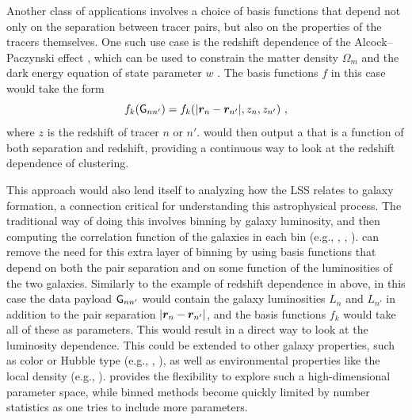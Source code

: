 Another class of applications involves a choice of basis functions that depend not only on the separation between tracer pairs, but also on the properties of the tracers themselves.
One such use case is the redshift dependence of the Alcock--Paczynski effect \citep{AlcockPaczynski1979}, which can be used to constrain the matter density $\Omega_m$ and the dark energy equation of state parameter $w$ \citep{Li2016}.
The basis functions $f$ in this case would take the form
\begin{equation}
    \label{eq:ff_redshift}
    f_k(\mathsf{G}_{n n'}) = f_k(|\bm{r}_n - \bm{r}_{n'}|, z_n, z_{n'}) ~,
\end{equation}
where $z$ is the redshift of tracer $n$ or $n'$.
\Est would then output a \cf that is a function of both separation and redshift, providing a continuous way to look at the redshift dependence of clustering.

This approach would also lend itself to analyzing how the LSS relates to galaxy formation, a connection critical for understanding this astrophysical process.
The traditional way of doing this involves binning by galaxy luminosity, and then computing the correlation function of the galaxies in each bin (e.g., \citealt{Budavari2003}, \citealt{Zehavi2011}, \citealt{Durkalec2018}).
\Est can remove the need for this extra layer of binning by using basis functions that depend on both the pair separation and on some function of the luminosities of the two galaxies.
Similarly to the example of redshift dependence in  above, in this case the data payload $\mathsf{G}_{n n'}$ would contain the galaxy luminosities $L_n$ and $L_{n'}$ in addition to the pair separation $|\bm{r}_n - \bm{r}_{n'}|$, and the basis functions $f_k$ would take all of these as parameters.
This would result in a direct way to look at the \cf luminosity dependence.
This could be extended to other galaxy properties, such as color or Hubble type (e.g., \citealt{Li2006}, \citealt{Skibba2014}), as well as environmental properties like the local density (e.g., \citealt{Abbas2006}).
\Est provides the flexibility to explore such a high-dimensional parameter space, while binned methods become quickly limited by number statistics as one tries to include more parameters.

